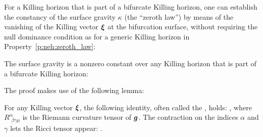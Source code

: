 For a Killing horizon that is part of a bifurcate Killing horizon, one can establish
the constancy of the surface gravity $\kappa$ (the ``zeroth law'') by means of the vanishing of
the Killing vector $\bm{\xi}$
at the bifurcation surface, without requiring the null dominance condition as for a generic Killing horizon
in Property~\ref{p:neh:zeroth_law}:

\begin{prop}
\label{p:neh:zeroth_law_bifur}
The surface gravity is a nonzero constant over any Killing horizon that is part of a
bifurcate Killing horizon:
\be
\ee
\end{prop}
The proof makes use of the following lemma:

\begin{lemma}
For any Killing vector $\bm{\xi}$, the following identity, often called the
, holds:
\be \label{e:neh:nabnab_xi_Riem}
    ,
\ee
where $R^\alpha_{\ \, \beta\gamma\mu}$ is the Riemann curvature tensor of $\bm{g}$.
The contraction on the indices $\alpha$ and $\gamma$ lets the Ricci tensor appear:
\be \label{e:neh:nabnab_xi_Ricci}
     .
\ee
\end{lemma}

